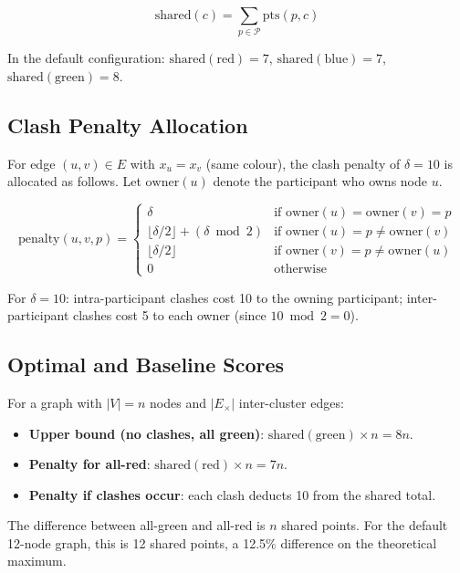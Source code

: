 \documentclass[11pt]{article}
\theoremstyle{definition}
\begin{document}
\[
  \text{shared}(c) = \sum_{p \in \mathcal{P}} \text{pts}(p, c)
\]

In the default configuration: $\text{shared}(\text{red}) = 7$,
$\text{shared}(\text{blue}) = 7$, $\text{shared}(\text{green}) = 8$.

\subsection{Clash Penalty Allocation}

For edge $(u, v) \in E$ with $x_u = x_v$ (same colour), the clash penalty of
$\delta = 10$ is allocated as follows.  Let $\mathrm{owner}(u)$ denote the participant
who owns node $u$.

\[
  \text{penalty}(u, v, p) = \begin{cases}
    \delta & \text{if } \mathrm{owner}(u) = \mathrm{owner}(v) = p \\
    \lfloor \delta / 2 \rfloor + (\delta \bmod 2) & \text{if } \mathrm{owner}(u) = p \neq \mathrm{owner}(v) \\
    \lfloor \delta / 2 \rfloor & \text{if } \mathrm{owner}(v) = p \neq \mathrm{owner}(u) \\
    0 & \text{otherwise}
  \end{cases}
\]

For $\delta = 10$: intra-participant clashes cost 10 to the owning participant;
inter-participant clashes cost 5 to each owner (since $10 \bmod 2 = 0$).

\subsection{Optimal and Baseline Scores}

For a graph with $|V| = n$ nodes and $|E_{\times}|$ inter-cluster edges:

\begin{itemize}[nosep]
  \item \textbf{Upper bound (no clashes, all green)}: $\text{shared}(\text{green}) \times n = 8n$.
  \item \textbf{Penalty for all-red}:  $\text{shared}(\text{red}) \times n = 7n$.
  \item \textbf{Penalty if clashes occur}: each clash deducts 10 from the shared total.
\end{itemize}

The difference between all-green and all-red is $n$ shared points.  For the default
12-node graph, this is 12 shared points, a 12.5\% difference on the theoretical maximum.
\end{document}
